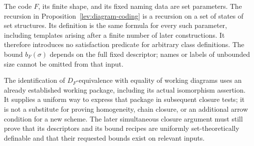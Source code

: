 \begin{remark}
\label{lev:coding-interface}
The code $F$, its finite shape, and its fixed naming data are set
parameters.  The recursion in Proposition~\ref{lev:diagram-coding}
is a recursion on a set of states of set structures.  Its definition
is the same formula for every such parameter, including templates
arising after a finite number of later constructions.  It therefore
introduces no satisfaction predicate for arbitrary class definitions.
The bound $b_F(\sigma)$ depends on the full fixed descriptor; names
or labels of unbounded size cannot be omitted from that input.

The identification of $D_F$-equivalence with equality of working diagrams
uses an already established working package, including its actual
isomorphism assertion.  It supplies a
uniform way to express that package in subsequent closure tests; it
is not a substitute for proving homogeneity, chain closure, or an
additional arrow condition for a new scheme.  The later simultaneous
closure argument must still prove that its descriptors and its bound
recipes are uniformly set-theoretically definable and that their
requested bounds exist on relevant inputs.
\end{remark}
